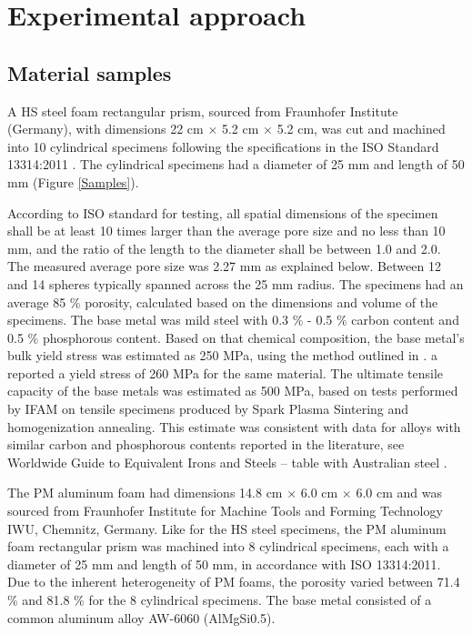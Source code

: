 \documentclass[review]{elsarticle}
\begin{document}
\section{Experimental approach}

\subsection*{Material samples}
A HS steel foam rectangular prism, sourced from Fraunhofer Institute (Germany), with dimensions 22 cm $\times$ 5.2 cm $\times$ 5.2 cm, was cut and machined into 10 cylindrical specimens following the specifications in the ISO Standard 13314:2011 \cite{ISO13314}. The cylindrical specimens had a diameter of 25 mm and length of 50 mm (Figure \ref{Samples}).

According to ISO standard for testing, all spatial dimensions of the specimen shall be at least 10 times larger than the average pore size and no less than 10 mm, and the ratio of the length to the diameter shall be between 1.0 and 2.0. The measured average pore size was 2.27 mm as explained below. Between 12 and 14 spheres typically spanned across the 25 mm radius. The specimens had an average 85 \% porosity, calculated based on the dimensions and volume of the specimens. The base metal was mild steel with 0.3 \% - 0.5 \% carbon content and 0.5 \% phosphorous content. Based on that chemical composition, the base metal’s bulk yield stress was estimated as 250 MPa, using the method outlined in \cite{Cobb1987}. \cite{Smith2012} a reported a yield stress of 260 MPa for the same material. The ultimate tensile capacity of the base metals was estimated as 500 MPa, based on tests performed by IFAM on tensile specimens produced by Spark Plasma Sintering and homogenization annealing. This estimate was consistent with data for alloys with similar carbon and phosphorous contents reported in the literature, see Worldwide Guide to Equivalent Irons and Steels – table with Australian steel \cite{Cobb1987}.

The PM aluminum foam had dimensions 14.8 cm $\times$ 6.0 cm $\times$ 6.0 cm and was sourced from Fraunhofer Institute for Machine Tools and Forming Technology IWU, Chemnitz, Germany. Like for the HS steel specimens, the PM aluminum foam rectangular prism was machined into 8 cylindrical specimens, each with a diameter of 25 mm and length of 50 mm, in accordance with ISO 13314:2011. Due to the inherent heterogeneity of PM foams, the porosity varied between 71.4 \% and 81.8 \% for the 8 cylindrical specimens. The base metal consisted of a common aluminum alloy AW-6060 (AlMgSi0.5).
 
\end{document}
